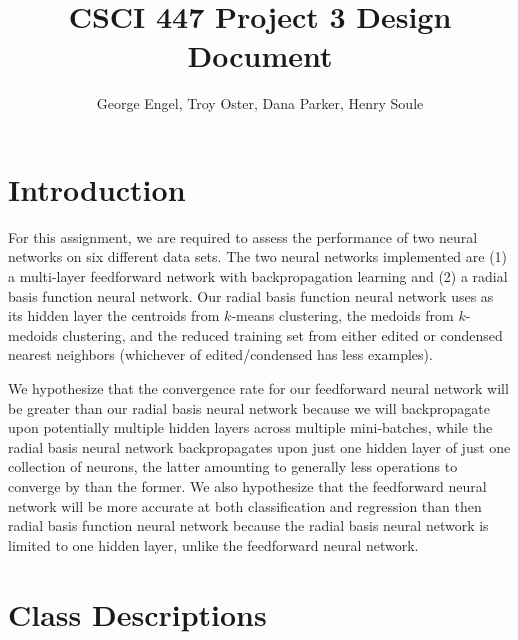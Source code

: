 \documentclass{article}
\title{CSCI 447 Project 3 Design Document}
\author{George Engel, Troy Oster, Dana Parker, Henry Soule}
\begin{document}
\maketitle

\section{Introduction}
For this assignment, we are required to assess the performance of two neural networks on six different data sets.
The two neural networks implemented are (1) a multi-layer feedforward network with backpropagation learning and (2) a radial basis function neural network.
Our radial basis function neural network uses as its hidden layer the centroids from $k$-means clustering, the medoids from $k$-medoids clustering, and the reduced training set from either edited or condensed nearest neighbors (whichever of edited/condensed has less examples).

We hypothesize that the convergence rate for our feedforward neural network will be greater than our radial basis neural network because we will backpropagate upon potentially multiple hidden layers across multiple mini-batches, while the radial basis neural network backpropagates upon just one hidden layer of just one collection of neurons, the latter amounting to generally less operations to converge by than the former.
We also hypothesize that the feedforward neural network will be more accurate at both classification and regression than then radial basis function neural network because the radial basis neural network is limited to one hidden layer, unlike the feedforward neural network.

\section{Class Descriptions}
\end{document}
